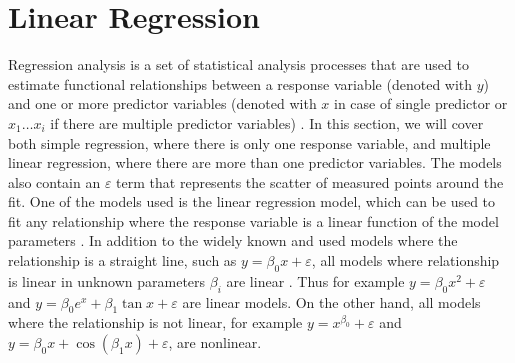 \documentclass[english, oneside]{HYgradu}
\begin{document}
\section{Linear Regression}
Regression analysis is a set of statistical analysis processes that are used to estimate functional relationships between a response variable (denoted with $y$) and one or more predictor variables (denoted with $x$ in case of single predictor or $x_1 \dots x_i$ if there are multiple predictor variables) \citep{feigelson2012modern}. In this section, we will cover both simple regression, where there is only one response variable, and multiple linear regression, where there are more than one predictor variables. The models also contain an $\varepsilon$ term that represents the scatter of measured points around the fit. One of the models used is the linear regression model, which can be used to fit any relationship where the response variable is a linear function of the model parameters \citep{montgomery2012introduction}. In addition to the widely known and used models where the relationship is a straight line, such as $y = \beta_0 x + \varepsilon$, 
all models where relationship is linear in unknown parameters $\beta_i$ are linear \citep{montgomery2012introduction}. Thus for example $y = \beta_0 x^2 + \varepsilon$ and $y = \beta_0 e^x + \beta_1 \tan{x} + \varepsilon$ are linear models.
On the other hand, all models where the relationship is not linear, for example $y = x^{\beta_0} + \varepsilon$ and $y = \beta_0 x + \cos{(\beta_1 x)} + \varepsilon$,
are nonlinear.
\end{document}
